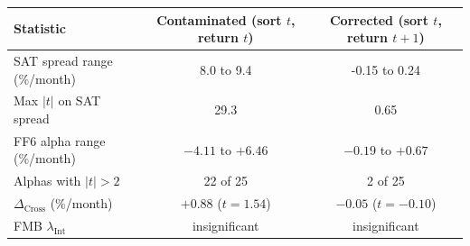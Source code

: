 \begin{tabular}{lcc}
\toprule
Statistic & Contaminated (sort $t$, return $t$) & Corrected (sort $t$, return $t{+}1$) \\
\midrule
SAT spread range (\%/month) & 8.0 to 9.4 & -0.15 to 0.24 \\
Max $|t|$ on SAT spread & 29.3 & 0.65 \\
FF6 alpha range (\%/month) & $-4.11$ to $+6.46$ & $-0.19$ to $+0.67$ \\
Alphas with $|t| > 2$ & 22 of 25 & 2 of 25 \\
$\Delta_\text{Cross}$ (\%/month) & $+0.88$ ($t = 1.54$) & $-0.05$ ($t = -0.10$) \\
FMB $\lambda_\text{Int}$ & insignificant & insignificant \\
\bottomrule
\end{tabular}